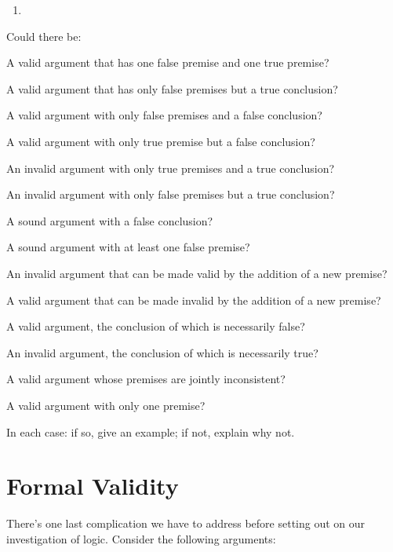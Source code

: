 \begin{enumerate}
\item {}

\end{enumerate}

\problempart
Could there be:
	\begin{earg}
		\item A valid argument that has one false premise and one true premise?
		\item A valid argument that has only false premises but a true conclusion?
		\item A valid argument with only false premises and a false conclusion?
		\item A valid argument with only true premise but a false conclusion?
		\item An invalid argument with only true premises and a true conclusion?
		\item An invalid argument with only false premises but a true conclusion?
		\item A sound argument with a false conclusion?
		\item A sound argument with at least one false premise?
		\item An invalid argument that can be made valid by the addition of a new premise?
		\item A valid argument that can be made invalid by the addition of a new premise?
		\item A valid argument, the conclusion of which is necessarily false?
		\item An invalid argument, the conclusion of which is necessarily true?
		\item A valid argument whose premises are jointly inconsistent?
		\item A valid argument with only one premise?
	\end{earg}
In each case: if so, give an example; if not, explain why not. 




\section{Formal Validity}\label{s:FormalValidity}

There's one last complication we have to address before setting out on our investigation of logic.  Consider the following arguments:

